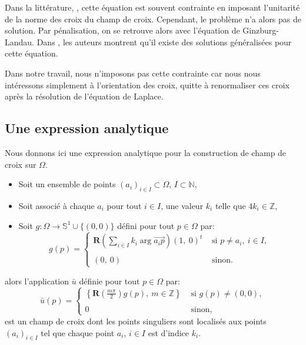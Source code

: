 Dans la littérature, \cite{beaufort2017computing, viertel2019approach}, cette équation est souvent contrainte en imposant l'unitarité de la norme des croix du champ de croix. Cependant, le problème n'a alors pas de solution. Par pénalisation, on se retrouve alors avec l'équation de Ginzburg-Landau. Dans \cite{bethuel1994ginzburg}, les auteurs montrent qu'il existe des solutions généralisées pour cette équation.

Dans notre travail, nous n'imposons pas cette contrainte car nous nous intéressons simplement à l'orientation des croix, quitte à renormaliser ces croix après la résolution de l'équation de Laplace.



\subsection{Une expression analytique}

Nous donnons ici une expression analytique pour la construction de champ de croix sur $\Omega$.\\
\begin{itemize}
\item Soit un ensemble de points $(a_i)_{i\in I}\subset\Omega$, $I\subset\mathbb{N}$,\\
\item Soit associé à chaque $a_i$ pour tout $i\in I$, une valeur $k_i$ telle que $4k_i\in\mathbb{Z}$,\\
\item Soit $g:\Omega\longrightarrow\mathbb{S}^1\cup\{(0,0)\}$ défini pour tout $p\in\Omega$ par:\\
\begin{equation}
g(p)=
\left\{
\begin{array}{ll}
\mathbf{R}\left(\displaystyle\sum_{i\in I} k_i\arg{\overrightarrow{a_ip}}\right)(1,~0)^t&\mbox{ si }p\neq a_i,~i\in I,\\\\
(0,~0) &\mbox{ sinon}.
\end{array}
\right.
\end{equation}
\end{itemize}
alors l'application $\bar{u}$ définie pour tout $p\in\Omega$ par:\\
\begin{equation}
\bar{u}(p)=
\left\{
\begin{array}{ll}
\displaystyle\left\{\mathbf{R}\left(\frac{m\pi}{2}\right)g(p),~ m\in \mathbb{Z}\right\} &\mbox{ si }g(p)\neq (0,0),\\\\
0& \text{ sinon},
\end{array}
\right.
\end{equation}
est un champ de croix dont les points singuliers sont localisés aux points $(a_i)_{i\in I}$ tel que chaque point $a_i$, $i\in I$ est d'indice $k_i$.

